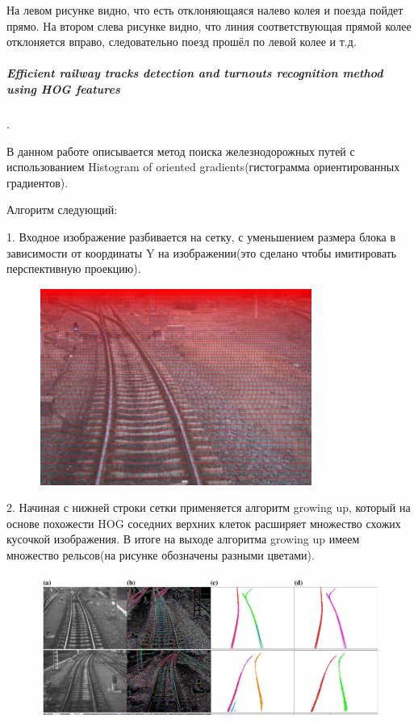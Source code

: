 На левом рисунке видно, что есть отклоняющаяся налево колея и поезда пойдет прямо.
На втором слева рисунке видно, что линия соответствующая прямой колее отклоняется вправо, следовательно поезд прошёл по левой колее и т.д.

\subparagraph{Efficient railway tracks detection and turnouts recognition method using HOG features \cite{b:growing_up}}.
\label{growing_up}

В данном работе описывается метод поиска железнодорожных путей с использованием Histogram of oriented gradients\cite{b:HOG}(гистограмма ориентированных градиентов).

\newpage
Алгоритм следующий:

1. Входное изображение разбивается на сетку, с уменьшением размера блока в зависимости от координаты Y на изображении(это сделано чтобы имитировать перспективную проекцию).
\begin{figure}[!h]
	\centering
	\includegraphics[width=0.5\linewidth]{pictures/screenshot009}
	\caption{}
	\label{fig:screenshot009}
\end{figure}

2. Начиная с нижней строки сетки применяется алгоритм growing up, который на основе похожести HOG соседних верхних клеток расширяет множество схожих кусочкой изображения.
В итоге на выходе алгоритма growing up имеем множество рельсов(на рисунке обозначены разными цветами).
\begin{figure}[!h]
	\centering
	\includegraphics[width=1\linewidth]{pictures/screenshot010}
	\caption{}
	\label{fig:screenshot010}
\end{figure}
\newpage
